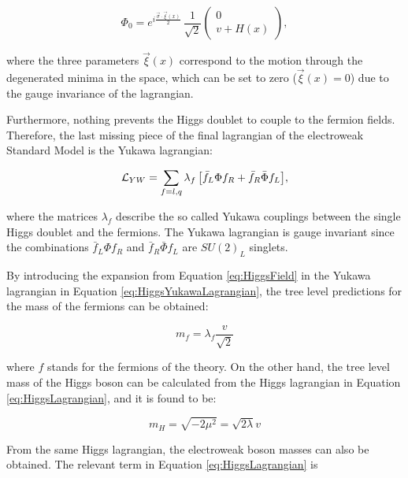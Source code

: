 \begin{equation}
\Phi_0 = e^{i\frac{\vec{\sigma}\cdot\vec{\xi}(x)}{2}} \, \frac{1}{\sqrt{2}} \left(
    \begin{matrix}
    0 \\
    v + H(x)
    \end{matrix}
    \right),
\label{eq:HiggsField}
\end{equation}

\noindent where the three parameters $\vec{\xi}(x)$ correspond to the motion through the degenerated minima in the space, which can be set to zero ($\vec{\xi}(x)=0$) due to the gauge invariance of the lagrangian.

Furthermore, nothing prevents the Higgs doublet to couple to the fermion fields.
Therefore, the last missing piece of the final lagrangian of the electroweak Standard Model is the Yukawa lagrangian:

\begin{equation}
\mathcal{L}_{YW} = \sum_{f=l,q}{\lambda_f \left[ \bar{f}_L \Phi f_R + \bar{f}_R \bar{\Phi}f_L \right]},
\label{eq:HiggsYukawaLagrangian}
\end{equation}

\noindent where the matrices $\lambda_f$ describe the so called Yukawa couplings between the single Higgs doublet and the fermions.
The Yukawa lagrangian is gauge invariant since the combinations $\bar{f}_L \Phi f_R$ and $\bar{f}_R \bar{\Phi} f_L$ are $SU(2)_L$ singlets.

By introducing the expansion from Equation \ref{eq:HiggsField} in the Yukawa lagrangian in Equation \ref{eq:HiggsYukawaLagrangian}, the tree level predictions for the mass of the fermions can be obtained:

\begin{equation}
m_f = \lambda_f \frac{v}{\sqrt{2}}
\label{eq:HiggsFermionMasses}
\end{equation}

\noindent where $f$ stands for the fermions of the theory.
On the other hand, the tree level mass of the Higgs boson can be calculated from the Higgs lagrangian in Equation \ref{eq:HiggsLagrangian}, and it is found to be:

\begin{equation}
m_H = \sqrt{-2\mu^2} = \sqrt{2\lambda} v
\label{eq:HiggsHiggsMass}
\end{equation}

From the same Higgs lagrangian, the electroweak boson masses can also be obtained.
The relevant term in Equation \ref{eq:HiggsLagrangian} is

